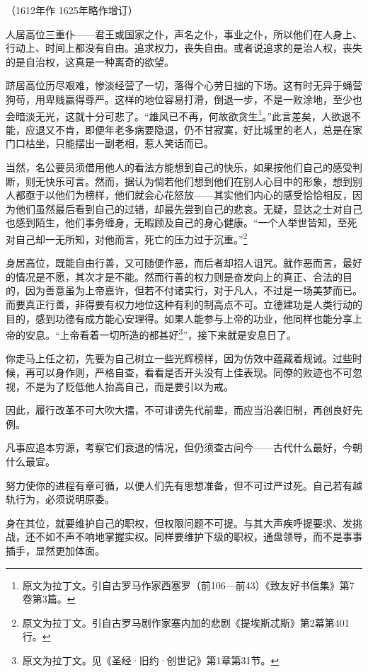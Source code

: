 \begin{center}
    （1612年作 1625年略作增订）
\end{center}
\par 人居高位三重仆——君王或国家之仆，声名之仆，事业之仆，所以他们在人身上、行动上、时间上都没有自由。追求权力，丧失自由。或者说追求的是治人权，丧失的是自治权，这真是一种离奇的欲望。
\par 跻居高位历尽艰难，惨淡经营了一切，落得个心劳日拙的下场。这有时无异于蝇营狗苟，用卑贱赢得尊严。这样的地位容易打滑，倒退一步，不是一败涂地，至少也会暗淡无光，这就十分可悲了。“雄风已不再，何故欲贪生\footnote{原文为拉丁文。引自古罗马作家西塞罗（前106—前43）《致友好书信集》第7卷第3篇。}。”此言差矣，人欲退不能，应退又不肯，即便年老多病要隐退，仍不甘寂寞，好比城里的老人，总是在家门口枯坐，只能摆出一副老相，惹人笑话而已。
\par 当然，名公要员须借用他人的看法方能想到自己的快乐，如果按他们自己的感受判断，则无快乐可言。然而，据认为倘若他们想到他们在别人心目中的形象，想到别人都亟于以他们为榜样，他们就会心花怒放——其实他们内心的感受恰恰相反，因为他们虽然最后看到自己的过错，却最先尝到自己的悲哀。无疑，显达之士对自己也感到陌生，他们事务缠身，无暇顾及自己的身心健康。“一个人举世皆知，至死对自己却一无所知，对他而言，死亡的压力过于沉重。”\footnote{原文为拉丁文。引自古罗马剧作家塞内加的悲剧《提埃斯忒斯》第2幕第401行。}
\par 身居高位，既能自由行善，又可随便作恶，而后者却招人诅咒。就作恶而言，最好的情况是不愿，其次才是不能。然而行善的权力则是奋发向上的真正、合法的目的，因为善意虽为上帝嘉许，但若不付诸实行，对于凡人，不过是一场美梦而已。而要真正行善，非得要有权力地位这种有利的制高点不可。立德建功是人类行动的目的，感到功德有成方能心安理得。如果人能参与上帝的功业，他同样也能分享上帝的安息。“上帝看着一切所造的都甚好\footnote{原文为拉丁文。见《圣经·旧约·创世记》第1章第31节。}”，接下来就是安息日了。
\par 你走马上任之初，先要为自己树立一些光辉榜样，因为仿效中蕴藏着规诫。过些时候，再可以身作则，严格自查，看看是否开头没有上佳表现。同僚的败迹也不可忽视，不是为了贬低他人抬高自己，而是要引以为戒。
\par 因此，履行改革不可大吹大擂，不可诽谤先代前辈，而应当沿袭旧制，再创良好先例。
\par 凡事应追本穷源，考察它们衰退的情况，但仍须查古问今——古代什么最好，今朝什么最宜。
\par 努力使你的进程有章可循，以便人们先有思想准备，但不可过严过死。自己若有越轨行为，必须说明原委。
\par 身在其位，就要维护自己的职权，但权限问题不可提。与其大声疾呼提要求、发挑战，还不如不声不响地掌握实权。同样要维护下级的职权，通盘领导，而不是事事插手，显然更加体面。

